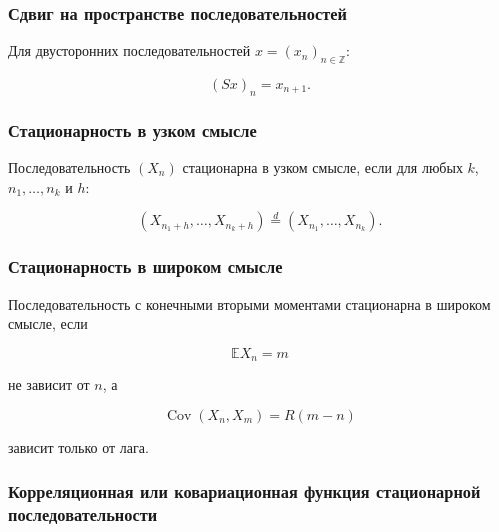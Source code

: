 \documentclass[
  11pt,
  a4paper,
]{article}
\begin{document}
\subsubsection{Сдвиг на пространстве
последовательностей}\label{ux441ux434ux432ux438ux433-ux43dux430-ux43fux440ux43eux441ux442ux440ux430ux43dux441ux442ux432ux435-ux43fux43eux441ux43bux435ux434ux43eux432ux430ux442ux435ux43bux44cux43dux43eux441ux442ux435ux439}

Для двусторонних последовательностей \(x=(x_n)_{n\in\mathbb Z}\):

\[
(Sx)_n=x_{n+1}.
\]

\subsubsection{Стационарность в узком
смысле}\label{ux441ux442ux430ux446ux438ux43eux43dux430ux440ux43dux43eux441ux442ux44c-ux432-ux443ux437ux43aux43eux43c-ux441ux43cux44bux441ux43bux435-1}

Последовательность \((X_n)\) стационарна в узком смысле, если для любых
\(k\), \(n_1,\ldots,n_k\) и \(h\):

\[
(X_{n_1+h},\ldots,X_{n_k+h})
\stackrel d=
(X_{n_1},\ldots,X_{n_k}).
\]

\subsubsection{Стационарность в широком
смысле}\label{ux441ux442ux430ux446ux438ux43eux43dux430ux440ux43dux43eux441ux442ux44c-ux432-ux448ux438ux440ux43eux43aux43eux43c-ux441ux43cux44bux441ux43bux435-1}

Последовательность с конечными вторыми моментами стационарна в широком
смысле, если

\[
\mathbb E X_n=m
\]

не зависит от \(n\), а

\[
\operatorname{Cov}(X_n,X_m)=R(m-n)
\]

зависит только от лага.

\subsubsection{Корреляционная или ковариационная функция стационарной
последовательности}\label{ux43aux43eux440ux440ux435ux43bux44fux446ux438ux43eux43dux43dux430ux44f-ux438ux43bux438-ux43aux43eux432ux430ux440ux438ux430ux446ux438ux43eux43dux43dux430ux44f-ux444ux443ux43dux43aux446ux438ux44f-ux441ux442ux430ux446ux438ux43eux43dux430ux440ux43dux43eux439-ux43fux43eux441ux43bux435ux434ux43eux432ux430ux442ux435ux43bux44cux43dux43eux441ux442ux438}
\end{document}
